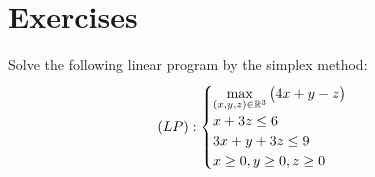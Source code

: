 
\section*{Exercises}

\begin{problem}[Basic]
Solve the following linear program by the simplex method:
\begin{equation*}
(LP): \begin{cases}
\displaystyle{\max_{(x,y,z) \in \mathbb{R}^3} \big( 4x+y-z \big)} \\
x+3z \leq 6 \\
3x+y+3z \leq 9 \\
x \geq 0, y\geq 0, z\geq 0
\end{cases}
\end{equation*}
\end{problem}